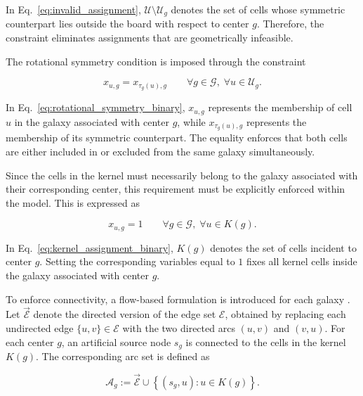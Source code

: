 In Eq.~\ref{eq:invalid_assignment}, \(\mathcal{U} \setminus \mathcal{U}_g\) denotes the set of cells whose symmetric counterpart lies outside the board with respect to center \(g\). Therefore, the constraint eliminates assignments that are geometrically infeasible.

The rotational symmetry condition is imposed through the constraint

\begin{equation}
x_{u,g} = x_{\tau_g(u),g}
\qquad
\forall g \in \mathcal{G}, \; \forall u \in \mathcal{U}_g.
\label{eq:rotational_symmetry_binary}
\end{equation}

In Eq.~\ref{eq:rotational_symmetry_binary}, \(x_{u,g}\) represents the membership of cell \(u\) in the galaxy associated with center \(g\), while \(x_{\tau_g(u),g}\) represents the membership of its symmetric counterpart. The equality enforces that both cells are either included in or excluded from the same galaxy simultaneously.

Since the cells in the kernel must necessarily belong to the galaxy associated with their corresponding center, this requirement must be explicitly enforced within the model. This is expressed as

\begin{equation}
x_{u,g} = 1
\qquad
\forall g \in \mathcal{G}, \; \forall u \in K(g).
\label{eq:kernel_assignment_binary}
\end{equation}

In Eq.~\ref{eq:kernel_assignment_binary}, \(K(g)\) denotes the set of cells incident to center \(g\). Setting the corresponding variables equal to \(1\) fixes all kernel cells inside the galaxy associated with center \(g\).

To enforce connectivity, a flow-based formulation is introduced for each galaxy \cite{miyazawa2021,validi2022}. Let \(\overrightarrow{\mathcal{E}}\) denote the directed version of the edge set \(\mathcal{E}\), obtained by replacing each undirected edge \(\{u,v\}\in\mathcal{E}\) with the two directed arcs \((u,v)\) and \((v,u)\). For each center \(g\), an artificial source node \(s_g\) is connected to the cells in the kernel \(K(g)\). The corresponding arc set is defined as

\begin{equation}
\mathcal{A}_g :=
\overrightarrow{\mathcal{E}}
\cup
\left\{(s_g,u): u \in K(g)\right\}.
\label{eq:flow_arc_set}
\end{equation}

